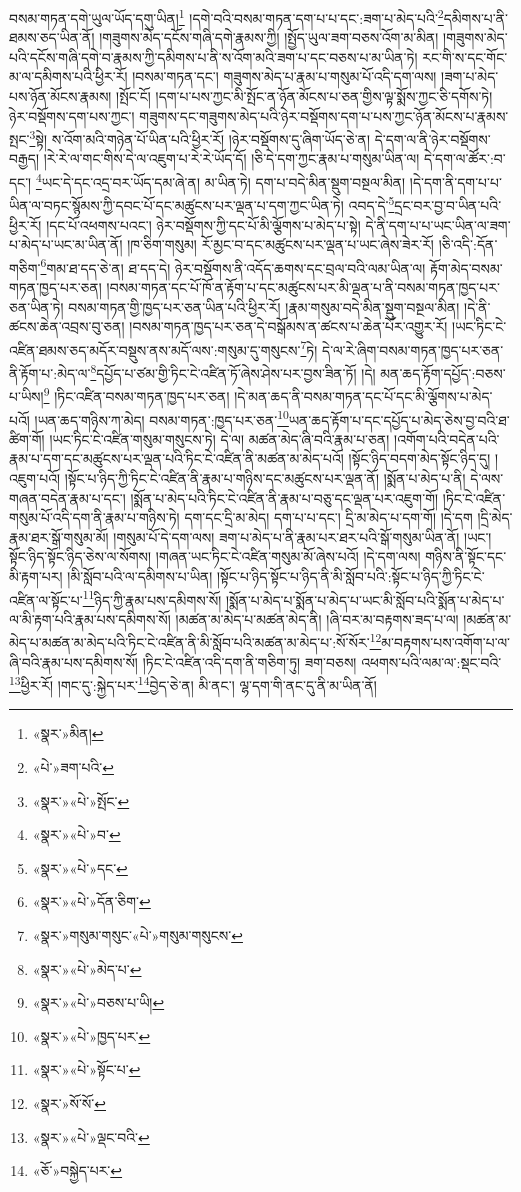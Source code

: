 བསམ་གཏན་དགེ་ཡུལ་ཡོད་དགུ་ཡིན།\footnote{«སྣར་»མིན།} །དགེ་བའི་བསམ་གཏན་དག་པ་པ་དང་:ཟག་པ་མེད་པའི་\footnote{«པེ་»ཟག་པའི་}དམིགས་པ་ནི་ཐམས་ཅད་ཡིན་ནོ། །གཟུགས་མེད་དངོས་གཞི་དགེ་རྣམས་ཀྱི། །སྤྱོད་ཡུལ་ཟག་བཅས་འོག་མ་མིན། །གཟུགས་མེད་པའི་དངོས་གཞི་དགེ་བ་རྣམས་ཀྱི་དམིགས་པ་ནི་ས་འོག་མའི་ཟག་པ་དང་བཅས་པ་མ་ཡིན་ཏེ། རང་གི་ས་དང་གོང་མ་ལ་དམིགས་པའི་ཕྱིར་རོ། །བསམ་གཏན་དང་། གཟུགས་མེད་པ་རྣམ་པ་གསུམ་པོ་འདི་དག་ལས། །ཟག་པ་མེད་པས་ཉོན་མོངས་རྣམས། །སྤོང་ངོ། །དག་པ་པས་ཀྱང་མི་སྤོང་ན་ཉོན་མོངས་པ་ཅན་གྱིས་ལྟ་སྨོས་ཀྱང་ཅི་དགོས་ཏེ། ཉེར་བསྡོགས་དག་པས་ཀྱང་། གཟུགས་དང་གཟུགས་མེད་པའི་ཉེར་བསྡོགས་དག་པ་པས་ཀྱང་ཉོན་མོངས་པ་རྣམས་སྤང་\footnote{«སྣར་»«པེ་»སྤོང་}སྟེ། ས་འོག་མའི་གཉེན་པོ་ཡིན་པའི་ཕྱིར་རོ། །ཉེར་བསྡོགས་དུ་ཞིག་ཡོད་ཅེ་ན། དེ་དག་ལ་ནི་ཉེར་བསྡོགས་བརྒྱད། །རེ་རེ་ལ་གང་གིས་དེ་ལ་འཇུག་པ་རེ་རེ་ཡོད་དོ། །ཅི་དེ་དག་ཀྱང་རྣམ་པ་གསུམ་ཡིན་ལ། དེ་དག་ལ་ཚོར་:བ་དང་། \footnote{«སྣར་»«པེ་»བ་}ཡང་དེ་དང་འདྲ་བར་ཡོད་དམ་ཞེ་ན། མ་ཡིན་ཏེ། དག་པ་བདེ་མིན་སྡུག་བསྔལ་མིན། །དེ་དག་ནི་དག་པ་པ་ཡིན་ལ་བཏང་སྙོམས་ཀྱི་དབང་པོ་དང་མཚུངས་པར་ལྡན་པ་དག་ཀྱང་ཡིན་ཏེ། འབད་དེ་\footnote{«སྣར་»«པེ་»དང་}དྲང་བར་བྱ་བ་ཡིན་པའི་ཕྱིར་རོ། །དང་པོ་འཕགས་པའང་། ཉེར་བསྡོགས་ཀྱི་དང་པོ་མི་ལྕོགས་པ་མེད་པ་སྟེ། དེ་ནི་དག་པ་པ་ཡང་ཡིན་ལ་ཟག་པ་མེད་པ་ཡང་མ་ཡིན་ནོ། །ཁ་ཅིག་གསུམ། རོ་མྱང་བ་དང་མཚུངས་པར་ལྡན་པ་ཡང་ཞེས་ཟེར་རོ། །ཅི་འདི་:དོན་གཅིག་\footnote{«སྣར་»«པེ་»དོན་ཅིག་}གམ་ཐ་དད་ཅེ་ན། ཐ་དད་དེ། ཉེར་བསྡོགས་ནི་འདོད་ཆགས་དང་བྲལ་བའི་ལམ་ཡིན་ལ། རྟོག་མེད་བསམ་གཏན་ཁྱད་པར་ཅན། །བསམ་གཏན་དང་པོ་ཁོ་ན་རྟོག་པ་དང་མཚུངས་པར་མི་ལྡན་པ་ནི་བསམ་གཏན་ཁྱད་པར་ཅན་ཡིན་ཏེ། བསམ་གཏན་གྱི་ཁྱད་པར་ཅན་ཡིན་པའི་ཕྱིར་རོ། །རྣམ་གསུམ་བདེ་མིན་སྡུག་བསྔལ་མིན། །དེ་ནི་ཚངས་ཆེན་འབྲས་བུ་ཅན། །བསམ་གཏན་ཁྱད་པར་ཅན་དེ་བསྒོམས་ན་ཚངས་པ་ཆེན་པོར་འགྱུར་རོ། །ཡང་ཏིང་ངེ་འཛིན་ཐམས་ཅད་མདོར་བསྡུས་ནས་མདོ་ལས་:གསུམ་དུ་གསུངས་\footnote{«སྣར་»གསུམ་གསུང་«པེ་»གསུམ་གསུངས་}ཏེ། དེ་ལ་རེ་ཞིག་བསམ་གཏན་ཁྱད་པར་ཅན་ནི་རྟོག་པ་:མེད་ལ་\footnote{«སྣར་»«པེ་»མེད་པ་}དཔྱོད་པ་ཙམ་གྱི་ཏིང་ངེ་འཛིན་ཏོ་ཞེས་ཤེས་པར་བྱས་ཟིན་ཏོ། །དེ། མན་ཆད་རྟོག་དཔྱོད་:བཅས་པ་ཡིས།\footnote{«སྣར་»«པེ་»བཅས་པ་ཡི།} །ཏིང་འཛིན་བསམ་གཏན་ཁྱད་པར་ཅན། །དེ་མན་ཆད་ནི་བསམ་གཏན་དང་པོ་དང་མི་ལྕོགས་པ་མེད་པའོ། །ཡན་ཆད་གཉིས་ཀ་མེད། བསམ་གཏན་:ཁྱད་པར་ཅན་\footnote{«སྣར་»«པེ་»ཁྱད་པར་}ཡན་ཆད་རྟོག་པ་དང་དཔྱོད་པ་མེད་ཅེས་བྱ་བའི་ཐ་ཚིག་གོ། །ཡང་ཏིང་ངེ་འཛིན་གསུམ་གསུངས་ཏེ། དེ་ལ། མཚན་མེད་ཞི་བའི་རྣམ་པ་ཅན། །འགོག་པའི་བདེན་པའི་རྣམ་པ་དག་དང་མཚུངས་པར་ལྡན་པའི་ཏིང་ངེ་འཛིན་ནི་མཚན་མ་མེད་པའོ། །སྟོང་ཉིད་བདག་མེད་སྟོང་ཉིད་དུ། །འཇུག་པའོ། །སྟོང་པ་ཉིད་ཀྱི་ཏིང་ངེ་འཛིན་ནི་རྣམ་པ་གཉིས་དང་མཚུངས་པར་ལྡན་ནོ། །སྨོན་པ་མེད་པ་ནི། དེ་ལས་གཞན་བདེན་རྣམ་པ་དང་། །སྨོན་པ་མེད་པའི་ཏིང་ངེ་འཛིན་ནི་རྣམ་པ་བཅུ་དང་ལྡན་པར་འཇུག་གོ། །ཏིང་ངེ་འཛིན་གསུམ་པོ་འདི་དག་ནི་རྣམ་པ་གཉིས་ཏེ། དག་དང་དྲི་མ་མེད། དག་པ་པ་དང་། དྲི་མ་མེད་པ་དག་གོ། །དེ་དག །དྲི་མེད་རྣམ་ཐར་སྒོ་གསུམ་མོ། །གསུམ་པོ་དེ་དག་ལས། ཟག་པ་མེད་པ་ནི་རྣམ་པར་ཐར་པའི་སྒོ་གསུམ་ཡིན་ནོ། །ཡང་། སྟོང་ཉིད་སྟོང་ཉིད་ཅེས་ལ་སོགས། །གཞན་ཡང་ཏིང་ངེ་འཛིན་གསུམ་མོ་ཞེས་པའོ། །དེ་དག་ལས། གཉིས་ནི་སྟོང་དང་མི་རྟག་པར། །མི་སློབ་པའི་ལ་དམིགས་པ་ཡིན། །སྟོང་པ་ཉིད་སྟོང་པ་ཉིད་ནི་མི་སློབ་པའི་:སྟོང་པ་ཉིད་ཀྱི་ཏིང་ངེ་འཛིན་ལ་སྟོང་པ་\footnote{«སྣར་»«པེ་»སྟོང་པ་}ཉིད་ཀྱི་རྣམ་པས་དམིགས་སོ། །སྨོན་པ་མེད་པ་སྨོན་པ་མེད་པ་ཡང་མི་སློབ་པའི་སྨོན་པ་མེད་པ་ལ་མི་རྟག་པའི་རྣམ་པས་དམིགས་སོ། །མཚན་མ་མེད་པ་མཚན་མེད་ནི། །ཞི་བར་མ་བརྟགས་ཟད་པ་ལ། །མཚན་མ་མེད་པ་མཚན་མ་མེད་པའི་ཏིང་ངེ་འཛིན་ནི་མི་སློབ་པའི་མཚན་མ་མེད་པ་:སོ་སོར་\footnote{«སྣར་»སོ་སོ་}མ་བརྟགས་པས་འགོག་པ་ལ་ཞི་བའི་རྣམ་པས་དམིགས་སོ། །ཏིང་ངེ་འཛིན་འདི་དག་ནི་གཅིག་ཏུ། ཟག་བཅས། འཕགས་པའི་ལམ་ལ་:སྡང་བའི་\footnote{«སྣར་»«པེ་»ལྡང་བའི་}ཕྱིར་རོ། །གང་དུ་:སྐྱེད་པར་\footnote{«ཅོ་»བསྐྱེད་པར་}བྱེད་ཅེ་ན། མི་ནང་། ལྷ་དག་གི་ནང་དུ་ནི་མ་ཡིན་ནོ། 